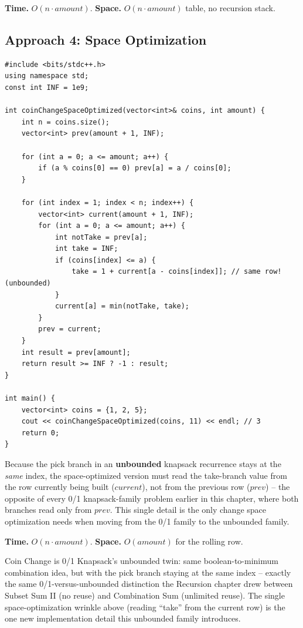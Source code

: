 \begin{complexitybox}
\textbf{Time.} $O(n \cdot \textit{amount})$.
\textbf{Space.} $O(n \cdot \textit{amount})$ table, no recursion stack.
\end{complexitybox}

\subsection*{Approach 4: Space Optimization}

\begin{lstlisting}
#include <bits/stdc++.h>
using namespace std;
const int INF = 1e9;

int coinChangeSpaceOptimized(vector<int>& coins, int amount) {
    int n = coins.size();
    vector<int> prev(amount + 1, INF);

    for (int a = 0; a <= amount; a++) {
        if (a % coins[0] == 0) prev[a] = a / coins[0];
    }

    for (int index = 1; index < n; index++) {
        vector<int> current(amount + 1, INF);
        for (int a = 0; a <= amount; a++) {
            int notTake = prev[a];
            int take = INF;
            if (coins[index] <= a) {
                take = 1 + current[a - coins[index]]; // same row! (unbounded)
            }
            current[a] = min(notTake, take);
        }
        prev = current;
    }
    int result = prev[amount];
    return result >= INF ? -1 : result;
}

int main() {
    vector<int> coins = {1, 2, 5};
    cout << coinChangeSpaceOptimized(coins, 11) << endl; // 3
    return 0;
}
\end{lstlisting}

\begin{ideabox}
Because the pick branch in an \textbf{unbounded} knapsack recurrence
stays at the \emph{same} index, the space-optimized version must read
the take-branch value from the row currently being built
($\textit{current}$), not from the previous row ($\textit{prev}$) --
the opposite of every 0/1 knapsack-family problem earlier in this
chapter, where both branches read only from $\textit{prev}$. This
single detail is the only change space optimization needs when moving
from the 0/1 family to the unbounded family.
\end{ideabox}

\begin{complexitybox}
\textbf{Time.} $O(n \cdot \textit{amount})$.
\textbf{Space.} $O(\textit{amount})$ for the rolling row.
\end{complexitybox}

\begin{takeawaybox}
Coin Change is 0/1 Knapsack's unbounded twin: same boolean-to-minimum
combination idea, but with the pick branch staying at the same index --
exactly the same 0/1-versus-unbounded distinction the Recursion
chapter drew between Subset Sum II (no reuse) and Combination Sum
(unlimited reuse). The single space-optimization wrinkle above (reading
``take'' from the current row) is the one new implementation detail this
unbounded family introduces.
\end{takeawaybox}
